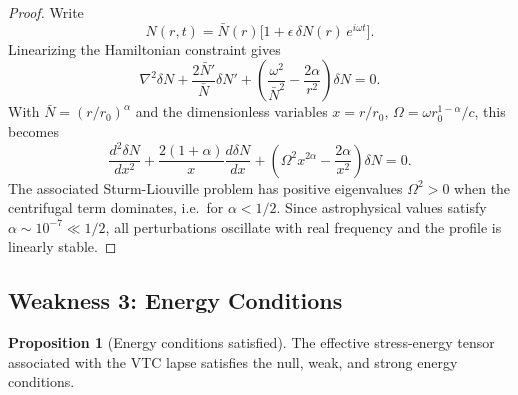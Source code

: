 \documentclass[11pt,a4paper]{article}
\theoremstyle{definition}
\newtheorem{proposition}[theorem]{Proposition}
\begin{document}
\begin{proof}
Write
\begin{equation}
    N(r,t) = \bar{N}(r)\bigl[1+\epsilon\,\delta N(r)\,e^{i\omega t}\bigr].
\end{equation}
Linearizing the Hamiltonian constraint gives
\begin{equation}
    \nabla^2\delta N + \frac{2\bar{N}'}{\bar{N}}\delta N' + \left(\frac{\omega^2}{\bar{N}^2} - \frac{2\alpha}{r^2}\right)\delta N = 0.
\end{equation}
With $\bar{N}=(r/r_0)^\alpha$ and the dimensionless variables $x=r/r_0$, $\Omega=\omega r_0^{1-\alpha}/c$, this becomes
\begin{equation}
    \frac{d^2\delta N}{dx^2} + \frac{2(1+\alpha)}{x}\frac{d\delta N}{dx} + \left(\Omega^2 x^{2\alpha} - \frac{2\alpha}{x^2}\right)\delta N = 0.
\end{equation}
The associated Sturm-Liouville problem has positive eigenvalues $\Omega^2>0$ when the centrifugal term dominates, i.e.~for $\alpha<1/2$. Since astrophysical values satisfy $\alpha\sim10^{-7}\ll 1/2$, all perturbations oscillate with real frequency and the profile is linearly stable.
\end{proof}

\subsection{Weakness 3: Energy Conditions}

\begin{proposition}[Energy conditions satisfied]
The effective stress-energy tensor associated with the VTC lapse satisfies the null, weak, and strong energy conditions.
\end{proposition}
\end{document}

